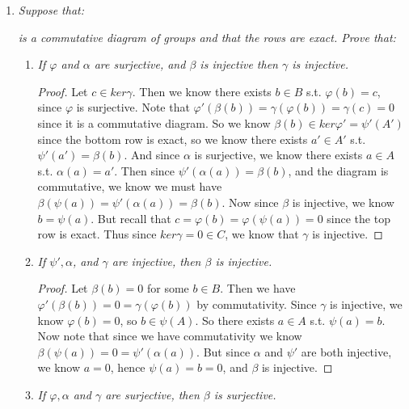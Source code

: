 \documentclass[12pt]{amsbook}
\theoremstyle{plain}
\numberwithin{section}{chapter}
\numberwithin{equation}{chapter}
\theoremstyle{definition}
\theoremstyle{remark}
\renewcommand{\phi}{\varphi}
\begin{document}
\begin{enumerate}[label=\arabic*.]
\item \textit{Suppose that: }
\begin{center}
\end{center}
\textit{is a commutative diagram of groups and that the rows are exact. Prove that: }
\begin{enumerate}
\item \textit{If $\phi$ and $\alpha$ are surjective, and $\beta$ is injective then $\gamma$ is injective. }
\begin{proof}
Let $c \in ker\gamma$. Then we know there exists $b \in B$ s.t. $\phi(b) = c$, since $\phi$ is surjective. Note that $\phi'(\beta(b)) = \gamma(\phi(b)) = \gamma(c) = 0$ since it is a commutative diagram. So we know $\beta(b) \in ker\phi' = \psi'(A')$ since the bottom row is exact, so we know there exists $a' \in A'$ s.t. $\psi'(a') = \beta(b)$. And since $\alpha$ is surjective, we know there exists $a \in A$ s.t. $\alpha(a) = a'$. Then since $\psi'(\alpha(a)) = \beta(b)$, and the diagram is commutative, we know we must have $\beta(\psi(a)) = \psi'(\alpha(a))  = \beta(b)$. Now since $\beta$ is injective, we know $b = \psi(a)$. But recall that $c = \phi(b) = \phi(\psi(a)) = 0$ since the top row is exact. Thus since $ker\gamma = 0 \in C$, we know that $\gamma$ is injective. 
\end{proof}

\item \textit{If $\psi',\alpha$, and $\gamma$ are injective, then $\beta$ is injective. }

\begin{proof}
Let $\beta(b) = 0$ for some $b \in B$. Then we have $\phi'(\beta(b)) = 0 = \gamma(\phi(b))$ by commutativity. Since $\gamma$ is injective, we know $\phi(b) = 0$, so $b \in \psi(A)$. So there exists $a \in A$ s.t. $\psi(a) = b$. Now note that since we have commutativity we know $\beta(\psi(a)) = 0 = \psi'(\alpha(a))$. But since $\alpha$ and $\psi'$ are both injective, we know $a = 0$, hence $\psi(a) = b = 0$, and $\beta$ is injective. 
\end{proof}

\item \textit{If $\phi,\alpha$ and $\gamma$ are surjective, then $\beta$ is surjective. }


\end{enumerate}
\end{enumerate}
\end{document}

